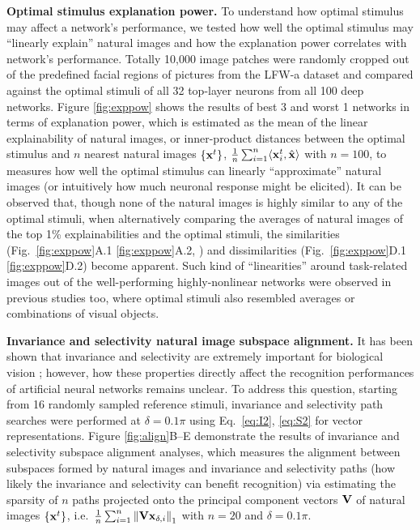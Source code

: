 \documentclass[10pt,twocolumn,letterpaper]{article}
\begin{document}
{\bf Optimal stimulus explanation power.} To understand how optimal stimulus may affect a network's performance, we {tested} how well the optimal stimulus may ``linearly explain'' natural images and how the explanation power correlates with network's performance.
Totally 10,000 image patches {were} randomly cropped out of the predefined facial regions of pictures from the LFW-a dataset \cite{wolf2011effective} and compared against the optimal stimuli of all 32 top-layer neurons from all 100 deep networks. 
Figure \ref{fig:exppow} shows the results of best 3 and worst 1 networks in terms of explanation power, which is estimated as the mean of the linear explainability of natural images, or inner-product distances between the optimal stimulus and $n$ nearest natural images $\left\lbrace {\bf{x}}^{t} \right\rbrace$, \ie $\frac{1}{n}\sum_{i=1}^{n} \langle {\bf{x}}^{t}_{i} , \hat{{\bf{x}}} \rangle$ with $n=100$, to measures how well the optimal stimulus can linearly ``approximate'' natural images (or intuitively how much neuronal response might be elicited).
It can be observed that, though none of the natural images is highly similar to any of the optimal stimuli, when alternatively comparing the averages of natural images of the top 1\% explainabilities and the optimal stimuli, the similarities (Fig.~\ref{fig:exppow}A.1 \vs \ref{fig:exppow}A.2, \etc) and dissimilarities (Fig.~\ref{fig:exppow}D.1 \vs \ref{fig:exppow}D.2) become apparent.
Such kind of ``linearities'' around task-related images out of the well-performing highly-nonlinear networks were observed in previous studies \cite{le2012building, simonyan2013deep} too, where optimal stimuli also resembled averages or combinations of visual objects.


{\bf Invariance and selectivity \vs natural image subspace alignment.} It has been shown that invariance and selectivity are extremely important for biological vision \cite{desimone1991face, ito1995size}; however, how these properties directly affect the recognition performances of artificial neural networks remains unclear.
To address this question, starting from 16 randomly sampled reference stimuli, invariance and selectivity path searches {were} performed at $\delta = 0.1\pi$ using Eq.~\ref{eq:I2}, \ref{eq:S2} for vector representations. 
Figure \ref{fig:align}B--E demonstrate the results of invariance and selectivity subspace alignment analyses, which measures the alignment between subspaces formed by natural images and invariance and selectivity paths (\ie how likely the invariance and selectivity can benefit recognition) via estimating the sparsity of $n$ paths projected onto the principal component vectors $\bf{V}$ of natural images $\left\lbrace {\bf{x}}^{t} \right\rbrace$, i.e.~$\frac{1}{n}\sum_{i=1}^{n} \left\| {\bf{Vx}}_{\delta,i} \right\|_{1}$ with $n=20$ and $\delta=0.1\pi$.
\end{document}
